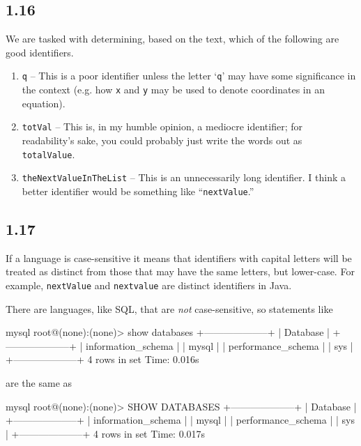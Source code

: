 \documentclass[leqno, 11pt]{article}
\begin{document}
\subsection*{1.16}
We are tasked with determining, based on the text, which of the following are good identifiers.
\begin{enumerate}
  \item \texttt{q} -- This is a poor identifier unless the letter `\texttt{q}' may have some significance in the context (e.g. how \texttt{x} and \texttt{y} may be used to denote coordinates in an equation).
  \item \texttt{totVal} -- This is, in my humble opinion, a mediocre identifier; for readability's sake, you could probably just write the words out as \texttt{totalValue}.
  \item \texttt{theNextValueInTheList} -- This is an unnecessarily long identifier. I think a better identifier would be something like ``\texttt{nextValue}.''
\end{enumerate}
\subsection*{1.17}
If a language is case-sensitive it means that identifiers with capital letters will be treated as distinct from those that may have the same letters, but lower-case. For example, \texttt{nextValue} and \texttt{nextvalue} are distinct identifiers in Java.

There are languages, like SQL, that are \textit{not} case-sensitive, so statements like
\begin{verbbox}
mysql root@(none):(none)> show databases
+--------------------+
| Database           |
+--------------------+
| information_schema |
| mysql              |
| performance_schema |
| sys                |
+--------------------+
4 rows in set
Time: 0.016s
\end{verbbox}
\begin{figure}[H]
  \centering
  \theverbbox
\end{figure}
are the same as
\begin{verbbox}
mysql root@(none):(none)> SHOW DATABASES
+--------------------+
| Database           |
+--------------------+
| information_schema |
| mysql              |
| performance_schema |
| sys                |
+--------------------+
4 rows in set
Time: 0.017s
\end{verbbox}
\begin{figure}[H]
  \centering
  \theverbbox
\end{figure}
\end{document}
